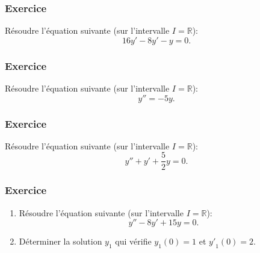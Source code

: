 \documentclass[10pt,a4paper]{article}
\begin{document}
\subsubsection{Exercice}
Résoudre l'équation suivante (sur l'intervalle $I=\mathbb{R}$):
$$16y'-8y'-y=0.$$

\subsubsection{Exercice}
Résoudre l'équation suivante (sur l'intervalle $I=\mathbb{R}$):
$$y''=-5y.$$

\subsubsection{Exercice}
Résoudre l'équation suivante (sur l'intervalle $I=\mathbb{R}$):
$$y''+y'+\dfrac{5}{2}y=0.$$

\subsubsection{Exercice}
\begin{enumerate}
\item
Résoudre l'équation suivante (sur l'intervalle $I=\mathbb{R}$):
$$y''-8y'+15y=0.$$
\item
Déterminer la solution $y_1$ qui vérifie $y_1(0)=1$ et ${y'}_1(0)=2$.
\end{enumerate}
\end{document}
